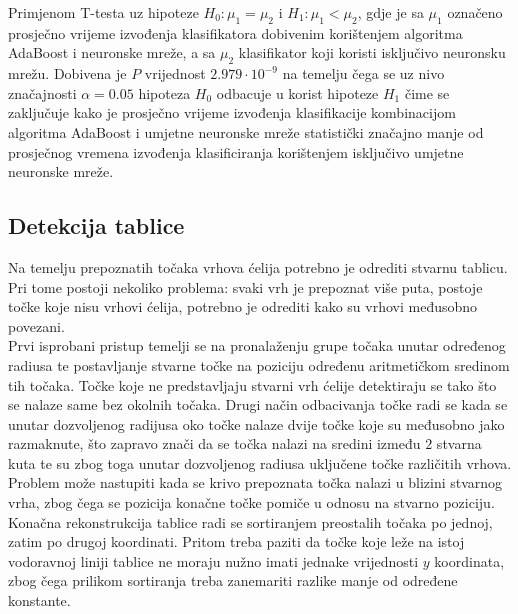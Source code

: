 \documentclass[times, utf8, zavrsni, numeric]{fer}
\begin{document}
Primjenom T-testa uz hipoteze $H_0: \mu_1 = \mu_2$ i $H_1: \mu_1 < \mu_2$, gdje je sa $\mu_1$ označeno prosječno vrijeme izvođenja klasifikatora dobivenim korištenjem algoritma AdaBoost i neuronske mreže, a sa $\mu_2$ klasifikator koji koristi isključivo neuronsku mrežu.
Dobivena je $P$ vrijednost $2.979\cdot10^{-9}$ na temelju čega se uz nivo značajnosti $\alpha = 0.05$   hipoteza $H_0$ odbacuje u korist hipoteze $H_1$ čime se zaključuje kako je prosječno vrijeme izvođenja klasifikacije kombinacijom algoritma AdaBoost i umjetne neuronske mreže statistički značajno manje od prosječnog vremena izvođenja klasificiranja korištenjem isključivo umjetne neuronske mreže.

\subsection{Detekcija tablice}
Na temelju prepoznatih točaka vrhova ćelija potrebno je odrediti stvarnu tablicu.
Pri tome postoji nekoliko problema: svaki vrh je prepoznat više puta, postoje točke koje nisu vrhovi ćelija, potrebno je odrediti kako su vrhovi međusobno povezani.\\

Prvi isprobani pristup temelji se na pronalaženju grupe točaka unutar određenog radiusa te postavljanje stvarne točke na poziciju određenu aritmetičkom sredinom tih točaka.
Točke koje ne predstavljaju stvarni vrh ćelije detektiraju se tako što se nalaze same bez okolnih točaka.
Drugi način odbacivanja točke radi se kada se unutar dozvoljenog radijusa oko točke nalaze dvije točke koje su međusobno jako razmaknute, što zapravo znači da se točka nalazi na sredini između $2$ stvarna kuta te su zbog toga unutar dozvoljenog radiusa uključene točke različitih vrhova.
Problem može nastupiti kada se krivo prepoznata točka nalazi u blizini stvarnog vrha, zbog čega se pozicija konačne točke pomiče u odnosu na stvarno poziciju.\\

Konačna rekonstrukcija tablice radi se sortiranjem preostalih točaka po jednoj, zatim po drugoj koordinati.
Pritom treba paziti da točke koje leže na istoj vodoravnoj liniji tablice ne moraju nužno imati jednake vrijednosti $y$ koordinata, zbog čega prilikom sortiranja treba zanemariti razlike manje od određene konstante.
\end{document}

